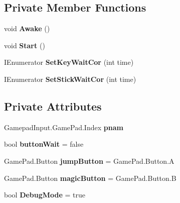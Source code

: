 \subsection*{Private Member Functions}
\begin{DoxyCompactItemize}
\item 
\mbox{\label{class_key_loader_a99de4801bb80b73597fc78522074ebb7}} 
void {\bfseries Awake} ()
\item 
\mbox{\label{class_key_loader_a0c057ca48be3695c65114dba52c887a1}} 
void {\bfseries Start} ()
\item 
\mbox{\label{class_key_loader_a49a8cae65d49a448aa479c32105a7259}} 
I\+Enumerator {\bfseries Set\+Key\+Wait\+Cor} (int time)
\item 
\mbox{\label{class_key_loader_a1f0112881b03e94bf57ea8a4fb87d63c}} 
I\+Enumerator {\bfseries Set\+Stick\+Wait\+Cor} (int time)
\end{DoxyCompactItemize}
\subsection*{Private Attributes}
\begin{DoxyCompactItemize}
\item 
\mbox{\label{class_key_loader_a93e39a51b410774fb1179f0985d922bf}} 
Gamepad\+Input.\+Game\+Pad.\+Index {\bfseries pnam}
\item 
\mbox{\label{class_key_loader_aad43d73762d5e9f241b7879d755daab5}} 
bool {\bfseries button\+Wait} = false
\item 
\mbox{\label{class_key_loader_a7894f40527eb083c37dd0aeab0df4588}} 
Game\+Pad.\+Button {\bfseries jump\+Button} = Game\+Pad.\+Button.\+A
\item 
\mbox{\label{class_key_loader_a1b5f69ce9f81983ea1883d08bec6afad}} 
Game\+Pad.\+Button {\bfseries magic\+Button} = Game\+Pad.\+Button.\+B
\item 
\mbox{\label{class_key_loader_a2532e3720d95472eb1178db18371a605}} 
bool {\bfseries Debug\+Mode} = true
\end{DoxyCompactItemize}


